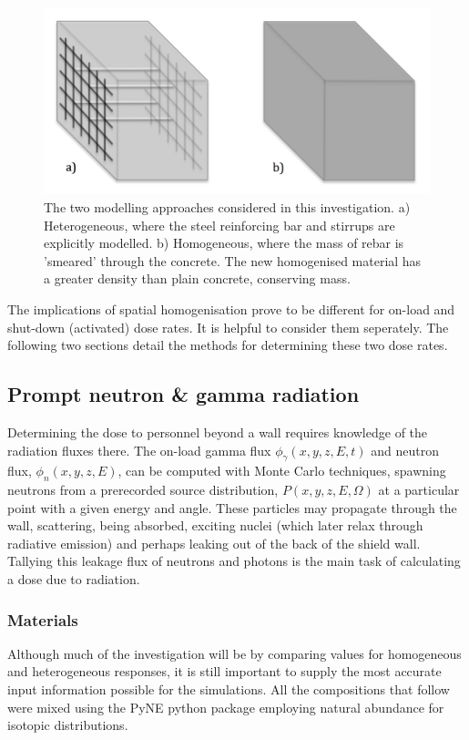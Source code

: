\begin{figure}[H]
	\includegraphics[width=\textwidth]{wall_diagram}
	\caption{The two modelling approaches considered in this investigation. a) Heterogeneous, where the steel reinforcing bar and stirrups are explicitly modelled. b) Homogeneous, where the mass of rebar is 'smeared' through the concrete. The new homogenised material has a greater density than plain concrete, conserving mass.}
	\label{fig:wall_diagram}
\end{figure}

The implications of spatial homogenisation prove to be different for on-load and shut-down (activated) dose rates. It is helpful to consider them seperately. The following two sections detail the methods for determining these two dose rates.

\subsection{Prompt neutron \& gamma radiation}
Determining the dose to personnel beyond a wall requires knowledge of the radiation fluxes there. The on-load gamma flux $\phi_{\gamma}(x,y,z,E,t)$ and neutron flux, $\phi_{n}(x,y,z,E)$, can be computed with Monte Carlo techniques, spawning neutrons from a prerecorded source distribution, $P(x,y,z,E,\Omega)$ at a particular point with a given energy and angle. These particles may propagate through the wall, scattering, being absorbed, exciting nuclei (which later relax through radiative emission) and perhaps leaking out of the back of the shield wall. Tallying this leakage flux of neutrons and photons is the main task of calculating a dose due to radiation.

\subsubsection{Materials}
Although much of the investigation will be by comparing values for homogeneous and heterogeneous responses, it is still important to supply the most accurate input information possible for the simulations. All the compositions that follow were mixed using the PyNE python package \cite{Pyne18} employing natural abundance for isotopic distributions.

